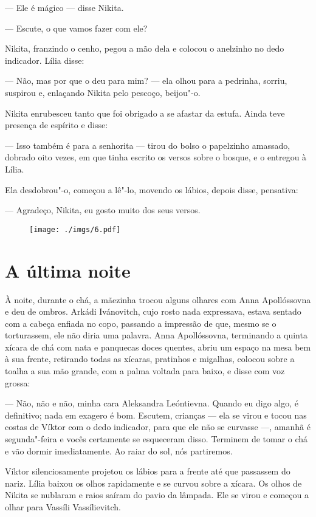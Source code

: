--- Ele é mágico --- disse Nikita.

--- Escute, o que vamos fazer com ele?

Nikita, franzindo o cenho, pegou a mão dela e colocou o anelzinho no
dedo indicador. Lília disse:

--- Não, mas por que o deu para mim? --- ela olhou para a pedrinha,
sorriu, suspirou e, enlaçando Nikita pelo pescoço, beijou"-o.

Nikita enrubesceu tanto que foi obrigado a se afastar da estufa. Ainda
teve presença de espírito e disse:

--- Isso também é para a senhorita --- tirou do bolso o papelzinho
amassado, dobrado oito vezes, em que tinha escrito os versos sobre o
bosque, e o entregou à Lília.

Ela desdobrou"-o, começou a lê"-lo, movendo os lábios, depois disse,
pensativa:

--- Agradeço, Nikita, eu gosto muito dos seus versos.

\begin{figure}
\vspace*{-2.65cm}
\hspace*{-2.85cm}\texttt{[image: ./imgs/6.pdf]}
\end{figure}

\chapter{A última noite}

À noite, durante o chá, a mãezinha trocou alguns olhares com Anna
Apollóssovna e deu de ombros. Arkádi Ivánovitch, cujo rosto nada
expressava, estava sentado com a cabeça enfiada no copo, passando a
impressão de que, mesmo se o torturassem, ele não diria uma palavra.
Anna Apollóssovna, terminando a quinta xícara de chá com nata e
panquecas doces quentes, abriu um espaço na mesa bem à sua frente,
retirando todas as xícaras, pratinhos e migalhas, colocou sobre a toalha
a sua mão grande, com a palma voltada para baixo, e disse com voz
grossa:

--- Não, não e não, minha cara Aleksandra Leóntievna. Quando eu digo
algo, é definitivo; nada em exagero é bom. Escutem, crianças --- ela se
virou e tocou nas costas de Víktor com o dedo indicador, para que ele
não se curvasse ---, amanhã é segunda"-feira e vocês certamente se
esqueceram disso. Terminem de tomar o chá e vão dormir imediatamente. Ao
raiar do sol, nós partiremos.

Víktor silenciosamente projetou os lábios para a frente até que
passassem do nariz. Lília baixou os olhos rapidamente e se curvou sobre
a xícara. Os olhos de Nikita se nublaram e raios saíram do pavio da
lâmpada. Ele se virou e começou a olhar para Vassíli Vassílievitch.

